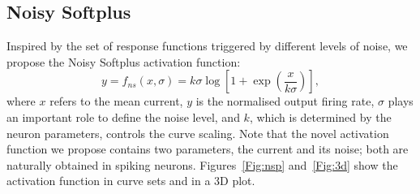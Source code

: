 		
	\subsection{Noisy Softplus}
	Inspired by the set of response functions triggered by different levels of noise, we propose the Noisy Softplus activation function:
	\begin{equation}
	y = f_{ns}(x, \sigma) = k \sigma \log [1 + \exp(\frac{x}{k \sigma})],
	\label{equ:nsp}
	\end{equation}
	where $x$ refers to the mean current, $y$ is the normalised output firing rate, $\sigma$ plays an important role to define the noise level, and $k$, which is determined by the neuron parameters, controls the curve scaling.
	Note that the novel activation function we propose contains two parameters, the current and its noise; both are naturally obtained in spiking neurons.
	Figures~\ref{Fig:nsp} and~\ref{Fig:3d} show the activation function in curve sets and in a 3D plot.
